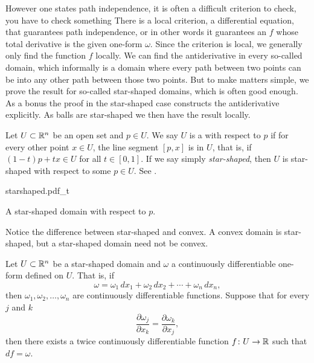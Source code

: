 However one states path independence, it is often a difficult criterion to
check, you have to check something 
There is a local criterion, a differential equation, that guarantees
path independence, or in other words it guarantees an
\emph{}
$f$ whose total derivative is the given one-form
$\omega$.  Since the criterion is local, we generally only find the
function $f$ locally.
We can find the antiderivative in every so-called
\emph{} domain, which informally is a domain where
every path between two points can be 
into any other path
between those two points.  But to make matters simple, we prove
the result for so-called star-shaped domains, which is often good enough.
As a bonus the proof in the star-shaped case constructs
the antiderivative explicitly.
As balls are star-shaped we then have the result locally.

\begin{defn}
Let $U \subset {\mathbb{R}}^n$ be an open set and $p \in U$.  We say $U$ is
a \emph{}
with respect to $p$ if for every other point $x \in U$,
the line segment $[p,x]$ is in $U$, that is, if
$(1-t)p + tx \in U$ for all $t \in [0,1]$.
If we say simply \emph{star-shaped}, then $U$ is star-shaped with respect to
some $p \in U$.  See .
\begin{myfigureht}
{starshaped.pdf_t}
\caption{A star-shaped domain with respect to $p$.\label{fig:starshaped}}
\end{myfigureht}
\end{defn}

Notice the difference between star-shaped and convex.  A convex domain is
star-shaped, but a star-shaped domain need not be convex.

\begin{thm}
Let $U \subset {\mathbb{R}}^n$ be a star-shaped domain and $\omega$ a continuously
differentiable one-form defined on $U$.  That is, if
\begin{equation*}
\omega =
\omega_1 \,dx_1 +
\omega_2 \,dx_2 + \cdots +
\omega_n \,dx_n ,
\end{equation*}
then $\omega_1,\omega_2,\ldots,\omega_n$ are continuously differentiable
functions.  Suppose that for every $j$ and $k$
\begin{equation*}
\frac{\partial \omega_j}{\partial x_k} = \frac{\partial \omega_k}{\partial x_j} ,
\end{equation*}
then there exists a twice continuously differentiable function $f \colon U
\to {\mathbb{R}}$
such that $df = \omega$.
\end{thm}


